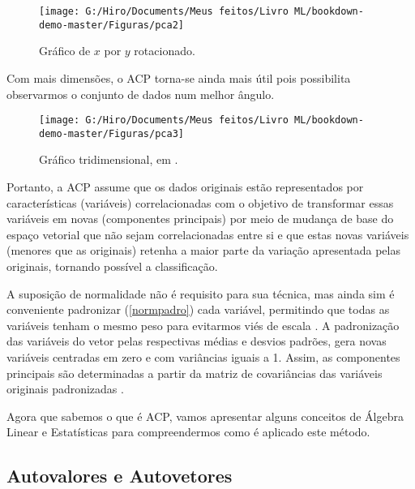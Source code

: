 \documentclass[
]{book}
\begin{document}
\begin{figure}

{\centering \texttt{[image: G:/Hiro/Documents/Meus feitos/Livro ML/bookdown-demo-master/Figuras/pca2]} 

}

\caption{Gráfico de \(x\) por \(y\) rotacionado.}\label{fig:pca2}
\end{figure}



Com mais dimensões, o ACP torna-se ainda mais útil pois possibilita observarmos o conjunto de dados num melhor ângulo.

\begin{figure}

{\centering \texttt{[image: G:/Hiro/Documents/Meus feitos/Livro ML/bookdown-demo-master/Figuras/pca3]} 

}

\caption{Gráfico tridimensional, em \citet{powellpca}.}\label{fig:pca3}
\end{figure}



Portanto, a ACP assume que os dados originais estão representados por características (variáveis) correlacionadas com o objetivo de transformar essas variáveis em novas (componentes principais) por meio de mudança de base do espaço vetorial que não sejam correlacionadas entre si e que estas novas variáveis (menores que as originais) retenha a maior parte da variação apresentada pelas originais, tornando possível a classificação.

A suposição de normalidade não é requisito para sua técnica, mas ainda sim é conveniente padronizar (\ref{normpadro}) cada variável, permitindo que todas as variáveis tenham o mesmo peso para evitarmos viés de escala \citep{hongyu2016analise}. A padronização das variáveis do vetor pelas respectivas médias e desvios padrões, gera novas variáveis centradas em zero e com variâncias iguais a 1. Assim, as componentes principais são determinadas a partir da matriz de covariâncias das variáveis originais padronizadas \citep{mingoti2007analise}.

Agora que sabemos o que é ACP, vamos apresentar alguns conceitos de Álgebra Linear e Estatísticas para compreendermos como é aplicado este método.

\hypertarget{autovalores-e-autovetores}{%
\subsection{Autovalores e Autovetores}\label{autovalores-e-autovetores}}
\end{document}
